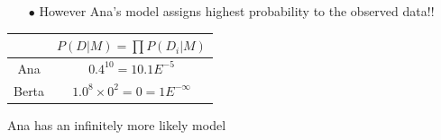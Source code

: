 \documentclass[shownotes]{beamer}
\begin{document}
\begin{frame}
{\begin{itemize}
 \item[$\bullet$] However Ana's model assigns highest probability to the observed data!! 
\end{itemize}
}

\pause \vspace{0.2cm}

  \begin{table}[H]
\begin{tabular}{c|c}
 & $P(D|M) = \prod P(D_i|M)$ \\ \hline
 Ana &  $0.4^{10}= 10.1E^{-5}$  \\
Berta & $1.0^8  \times 0^2 = 0 = 1E^{-\infty}$\\
 \end{tabular}
\end{table}
\vspace{-0.1cm}
\begin{framed}
\centering 

Ana has an infinitely more likely model
\end{framed}


\end{frame}


% 
% 
% 
% 
% 
\end{document}
